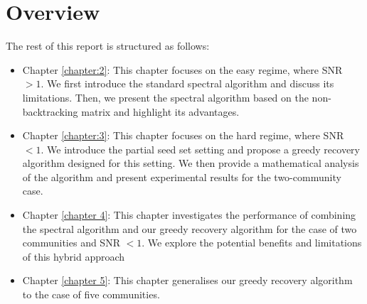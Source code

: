 \section{Overview}
The rest of this report is structured as follows:
\begin{itemize}
    \item Chapter \ref{chapter:2}: This chapter focuses on the easy regime, where SNR $>1.$ We first introduce the standard spectral algorithm and discuss its limitations. Then, we present the spectral algorithm based on the non-backtracking matrix and highlight its advantages.
    \item Chapter \ref{chapter:3}: This chapter focuses on the hard regime, where SNR $<1.$ We introduce the partial seed set setting and propose a greedy recovery algorithm designed for this setting. We then provide a mathematical analysis of the algorithm and present experimental results for the two-community case.
    \item Chapter \ref{chapter 4}: This chapter investigates the performance of combining the spectral algorithm and our greedy recovery algorithm for the case of two communities and SNR $<1.$ We explore the potential benefits and limitations of this hybrid approach
    \item Chapter \ref{chapter 5}: This chapter generalises our greedy recovery algorithm to the case of five communities.
\end{itemize}
